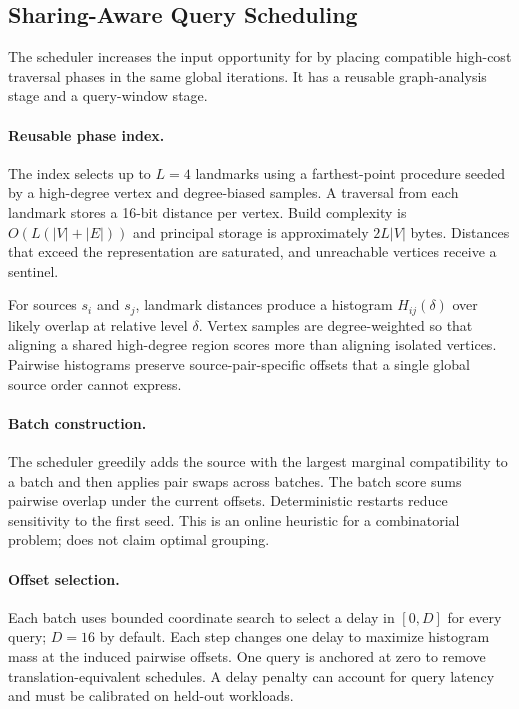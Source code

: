 \subsection{Sharing-Aware Query Scheduling}
\label{sec:planner}



The scheduler increases the input opportunity for \sharedexpand by placing compatible high-cost traversal phases in the same global iterations.  It has a reusable graph-analysis stage and a query-window stage.

\paragraph{Reusable phase index.}
The index selects up to $L=4$ landmarks using a farthest-point procedure seeded by a high-degree vertex and degree-biased samples.  A traversal from each landmark stores a 16-bit distance per vertex.  Build complexity is $O(L(|V|+|E|))$ and principal storage is approximately $2L|V|$ bytes.  Distances that exceed the representation are saturated, and unreachable vertices receive a sentinel.

For sources $s_i$ and $s_j$, landmark distances produce a histogram $H_{ij}(\delta)$ over likely overlap at relative level $\delta$.  Vertex samples are degree-weighted so that aligning a shared high-degree region scores more than aligning isolated vertices.  Pairwise histograms preserve source-pair-specific offsets that a single global source order cannot express.

\paragraph{Batch construction.}
The scheduler greedily adds the source with the largest marginal compatibility to a batch and then applies pair swaps across batches.  The batch score sums pairwise overlap under the current offsets.  Deterministic restarts reduce sensitivity to the first seed.  This is an online heuristic for a combinatorial problem; \system does not claim optimal grouping.

\paragraph{Offset selection.}
Each batch uses bounded coordinate search to select a delay in $[0,D]$ for every query; $D=16$ by default.  Each step changes one delay to maximize histogram mass at the induced pairwise offsets.  One query is anchored at zero to remove translation-equivalent schedules.  A delay penalty can account for query latency and must be calibrated on held-out workloads.

